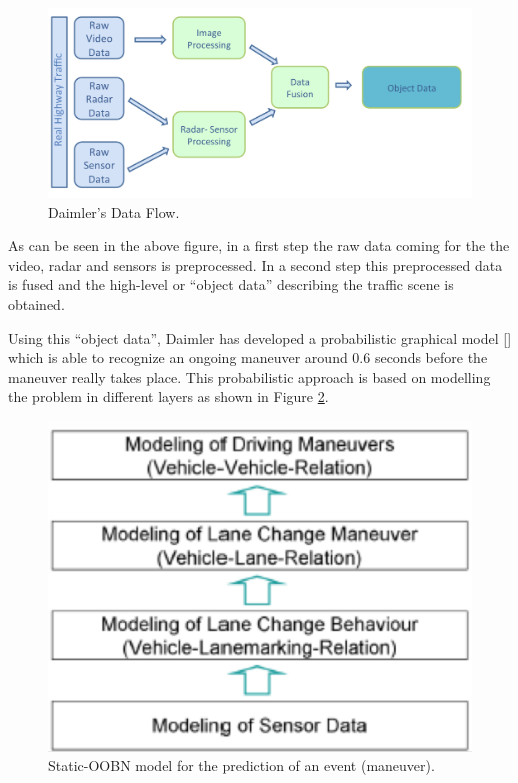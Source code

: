 \begin{figure}
\begin{center}
\includegraphics[scale=0.35]{./figures/DaimlerDataFlow}
\caption{\label{Figure:DaimlerDataFlow} Daimler's Data Flow.}
\end{center}
\end{figure}

As can be seen in the above figure, in a first step the raw data coming for the the video, radar and sensors is preprocessed. In a second step this preprocessed data is fused and the high-level or ``object data'' describing the traffic scene is obtained. 

Using this ``object data'', Daimler has developed a probabilistic graphical model [] which is able to recognize an ongoing maneuver around 0.6 seconds before the maneuver really takes place. This probabilistic approach is based on modelling the problem in different layers as shown in Figure \ref{Figure:DaimlerHierarchicalModelling}.


\begin{figure}
\begin{center}
\includegraphics[scale=0.35]{./figures/DaimlerHierarchicalModelling}
\caption{\label{Figure:DaimlerHierarchicalModelling} Static-OOBN model for the prediction of an event (maneuver).}
\end{center}
\end{figure}


